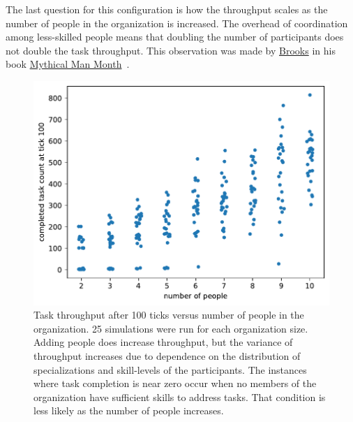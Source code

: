 The last question for this configuration is how the throughput scales as the number of people in the organization is increased.
The overhead of coordination among less-skilled people means that doubling the number of participants does not double the task throughput. This observation was made by 
\href{https://en.wikipedia.org/wiki/Fred_Brooks}{Brooks} in his book 
\href{https://en.wikipedia.org/wiki/The_Mythical_Man-Month}{Mythical Man Month}~\cite{1975_brooks}. 

\begin{figure}[!htb] %
\centering
\includegraphics[width=1\textwidth]{images/task_distribution_completed_versus_size_simCount25_skills2_levels1_taskduration1_people2_social0_ticks100.pdf}
\caption{Task throughput after 100 ticks versus number of people in the organization. 25 simulations were run for each organization size. 
Adding people does increase throughput, but the variance of throughput increases due to dependence on the distribution of specializations and skill-levels of the participants. The instances where task completion is near zero occur when no members of the organization have sufficient skills to address tasks. That condition is less likely as the number of people increases.
}
\label{fig:task-distribution-completed-vs-size}
\end{figure}


